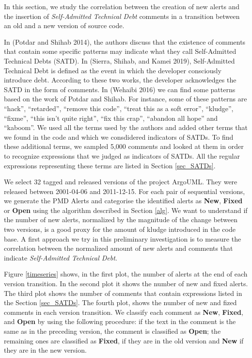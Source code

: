 \documentclass[
]{article}
\begin{document}
In this section, we study the correlation between the creation of new
alerts and the insertion of \textit{Self-Admitted Technical Debt}
comments in a transition between an old and a new version of source
code.

In (Potdar and Shihab 2014), the authors discuss that the existence of
comments that contain some specific patterns may indicate what they call
Self-Admitted Technical Debts (SATD). In (Sierra, Shihab, and Kamei
2019), Self-Admitted Technical Debt is defined as the event in which the
developer consciously introduce debt. According to these two works, the
developer acknowledges the SATD in the form of comments. In (Wehaibi
2016) we can find some patterns based on the work of Potdar and Shihab.
For instance, some of these patterns are ``hack'', ``retarded'',
``remove this code'', ``treat this as a soft error'', ``kludge'',
``fixme'', ``this isn't quite right'', ``fix this crap'', ``abandon all
hope'' and ``kaboom''. We used all the terms used by the authors and
added other terms that we found in the code and which we consdidered
indicators of SATDs. To find these additional terms, we sampled 5,000
comments and looked at them in order to recognize expressions that we
judged as indicators of SATDs. All the regular expressions representing
these terms are listed in Section \ref{sec_SATDs}.

We select 32 tagged and released versions of the project ArgoUML. They
were released between 2001-04-06 and 2011-12-15. For each pair of
sequential versions, we generate the PMD Alerts and categorise the
identified alerts as \textbf{New}, \textbf{Fixed} or \textbf{Open} using
the algorithm described in Section \ref{alg}. We want to understand if
the number of new alerts, normalized by the magnitude of the change
between two versions, is a good proxy for the amount of kludge
introduced in the code base. A first approach we try in this preliminary
investigation is to measure the correlation between the normalized
amount of new alerts and comments that indicate
\textit{Self-Admitted Technical Debt}.

\small

\normalsize

Figure \ref{timeseries} shows, in the first plot, the number of alerts
at the end of each version transition. In the second plot it shows the
number of new and fixed alerts. The third plot shows the number of
comments that contain expressions listed in the Section \ref{sec_SATDs}.
The fourth plot, shows the number of new and fized comments in each
version transition. We classify each comment as \textbf{New},
\textbf{Fixed}, and \textbf{Open} by using the following procedure: if
the text in the comment is the same as in the preceding version, the
comment is classified as \textbf{Open}; the remaining ones are
classified as \textbf{Fixed}, if they are in the old version and
\textbf{New} if they are in the new version.
\end{document}
